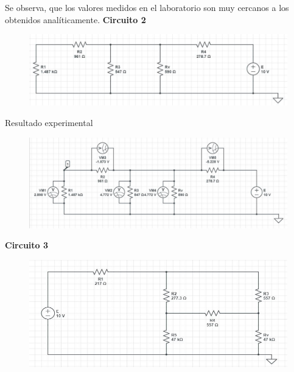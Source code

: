 \documentclass[a4paper,12pt]{report}
\begin{document}
\begin{enumerate}
\begin{figure}[H]
\end{figure}
Se observa, que los valores medidos en el laboratorio son muy cercanos a los obtenidos analíticamente.
\newpage
\textbf{Circuito 2}
\begin{figure}[H]
\begin{center}
\includegraphics[scale=0.5]{circ2kesken.png}
\end{center}
\end{figure}
Resultado experimental
\begin{figure}[H]
\begin{center}
\includegraphics[scale=0.43]{circ2,1kesken.png}
\end{center}
\end{figure}
\newpage
\textbf{Circuito 3}
\begin{figure}[H]
\begin{center}
\includegraphics[scale=0.45]{circ3,1kesken.png}

\end{center}
\end{figure}
\end{enumerate}
\end{document}
